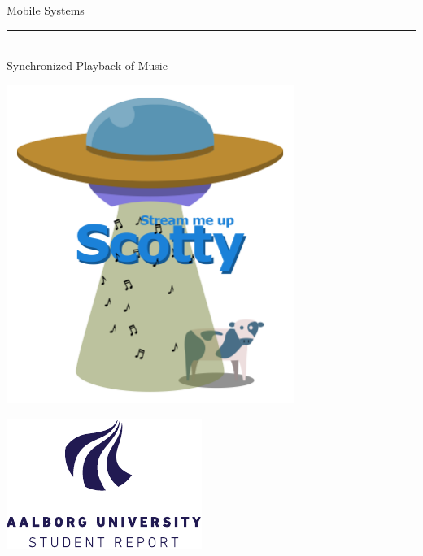 %
\newcommand{\titlefont}{\sffamily\fontsize{36pt}{0pt}\selectfont}
\newcommand{\subtitlefont}{\sffamily\fontsize{26pt}{0pt}\selectfont}
\newcommand{\smallfont}{\sffamily\fontsize{12pt}{0pt}\selectfont}
\begin{titlepage}
    \noindent%
        \begin{center}
            \titlefont Mobile Systems\\
            \vspace{0.2cm}
            \rule{90pt}{1pt}\\
            \vspace{0.2cm}
            \subtitlefont Synchronized Playback of Music
        \end{center}
    \null\vfill
    \begin{minipage}{1\textwidth}
        \centering
        \includegraphics[width=0.7\textwidth]{img/scotty_white.png}
    \end{minipage}
    \null\vfill
    \vspace*{1cm}
    \noindent
    \begin{minipage}{0.4\linewidth}
        \begin{flushleft}
        \includegraphics[width=0.8\linewidth]{img/aau_logo_en.pdf}

\end{flushleft}
\end{minipage}
\end{titlepage}
